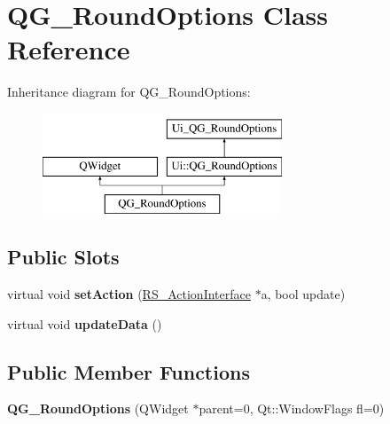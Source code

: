 \hypertarget{classQG__RoundOptions}{\section{Q\-G\-\_\-\-Round\-Options Class Reference}
\label{classQG__RoundOptions}
}
Inheritance diagram for Q\-G\-\_\-\-Round\-Options\-:\begin{figure}[H]
\begin{center}
\leavevmode
\includegraphics[height=3.000000cm]{classQG__RoundOptions}
\end{center}
\end{figure}
\subsection*{Public Slots}
\begin{DoxyCompactItemize}
\item 
\hypertarget{classQG__RoundOptions_ae88988e51b4f716422cad01524909b5c}{virtual void {\bfseries set\-Action} (\hyperlink{classRS__ActionInterface}{R\-S\-\_\-\-Action\-Interface} $\ast$a, bool update)}\label{classQG__RoundOptions_ae88988e51b4f716422cad01524909b5c}

\item 
\hypertarget{classQG__RoundOptions_a8f28eb1380cd2f6571e6eb8098324636}{virtual void {\bfseries update\-Data} ()}\label{classQG__RoundOptions_a8f28eb1380cd2f6571e6eb8098324636}

\end{DoxyCompactItemize}
\subsection*{Public Member Functions}
\begin{DoxyCompactItemize}
\item 
\hypertarget{classQG__RoundOptions_a803724b1a0025f98c6c56ff61074aea8}{{\bfseries Q\-G\-\_\-\-Round\-Options} (Q\-Widget $\ast$parent=0, Qt\-::\-Window\-Flags fl=0)}\label{classQG__RoundOptions_a803724b1a0025f98c6c56ff61074aea8}

\end{DoxyCompactItemize}
